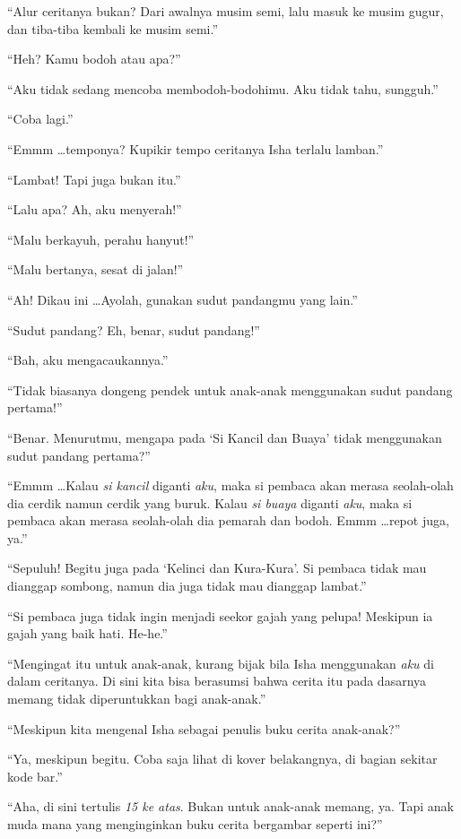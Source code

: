 \documentclass[smalldemyvopaper,11pt,twoside,onecolumn,openright,extrafontsizes]{memoir}
\begin{document}
``Alur ceritanya bukan? Dari awalnya musim semi, lalu masuk ke musim gugur, dan tiba-tiba kembali ke musim semi.''

``Heh? Kamu bodoh atau apa?''

``Aku tidak sedang mencoba membodoh-bodohimu. Aku tidak tahu, sungguh.''

``Coba lagi.''

``Emmm \dots temponya? Kupikir tempo ceritanya Isha terlalu lamban.''

``Lambat! Tapi juga bukan itu.''

``Lalu apa? Ah, aku menyerah!''

``Malu berkayuh, perahu hanyut!''

``Malu bertanya, sesat di jalan!''

``Ah! Dikau ini \dots Ayolah, gunakan sudut pandangmu yang lain.''

``Sudut pandang? Eh, benar, sudut pandang!''

``Bah, aku mengacaukannya.''

``Tidak biasanya dongeng pendek untuk anak-anak menggunakan sudut pandang pertama!''

``Benar. Menurutmu, mengapa pada `Si Kancil dan Buaya' tidak menggunakan sudut pandang pertama?''

``Emmm \dots Kalau \textit{si kancil} diganti \textit{aku}, maka si pembaca akan merasa seolah-olah dia cerdik namun cerdik yang buruk. Kalau \textit{si buaya} diganti \textit{aku}, maka si pembaca akan merasa seolah-olah dia pemarah dan bodoh. Emmm \dots repot juga, ya.''

``Sepuluh! Begitu juga pada `Kelinci dan Kura-Kura'. Si pembaca tidak mau dianggap sombong, namun dia juga tidak mau dianggap lambat.''

``Si pembaca juga tidak ingin menjadi seekor gajah yang pelupa! Meskipun ia gajah yang baik hati. He-he.''

``Mengingat itu untuk anak-anak, kurang bijak bila Isha menggunakan \textit{aku} di dalam ceritanya. Di sini kita bisa berasumsi bahwa cerita itu pada dasarnya memang tidak diperuntukkan bagi anak-anak.''

``Meskipun kita mengenal Isha sebagai penulis buku cerita anak-anak?''

``Ya, meskipun begitu. Coba saja lihat di kover belakangnya, di bagian sekitar kode bar.''

``Aha, di sini tertulis \textit{15 ke atas}. Bukan untuk anak-anak memang, ya. Tapi anak muda mana yang menginginkan buku cerita bergambar seperti ini?''
\end{document}
